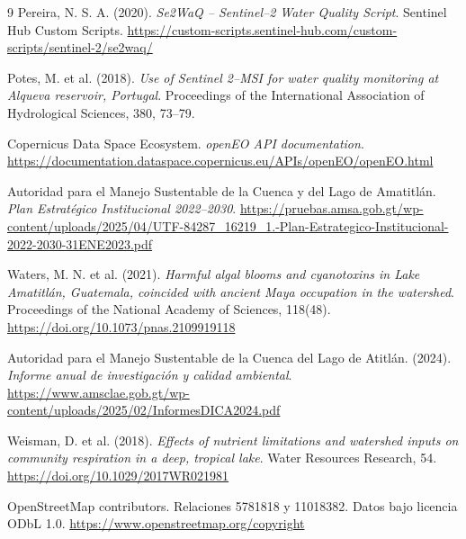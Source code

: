 \documentclass[11pt,letterpaper]{article}
\begin{document}
\begin{thebibliography}{9}
Pereira, N. S. A. (2020). \textit{Se2WaQ -- Sentinel--2 Water Quality Script}. Sentinel Hub Custom Scripts. \url{https://custom-scripts.sentinel-hub.com/custom-scripts/sentinel-2/se2waq/}

Potes, M. et al. (2018). \textit{Use of Sentinel 2--MSI for water quality monitoring at Alqueva reservoir, Portugal}. Proceedings of the International Association of Hydrological Sciences, 380, 73--79.

Copernicus Data Space Ecosystem. \textit{openEO API documentation}. \url{https://documentation.dataspace.copernicus.eu/APIs/openEO/openEO.html}

Autoridad para el Manejo Sustentable de la Cuenca y del Lago de Amatitlán. \textit{Plan Estratégico Institucional 2022--2030}. \url{https://pruebas.amsa.gob.gt/wp-content/uploads/2025/04/UTF-84287_16219_1.-Plan-Estrategico-Institucional-2022-2030-31ENE2023.pdf}

Waters, M. N. et al. (2021). \textit{Harmful algal blooms and cyanotoxins in Lake Amatitlán, Guatemala, coincided with ancient Maya occupation in the watershed}. Proceedings of the National Academy of Sciences, 118(48). \url{https://doi.org/10.1073/pnas.2109919118}

Autoridad para el Manejo Sustentable de la Cuenca del Lago de Atitlán. (2024). \textit{Informe anual de investigación y calidad ambiental}. \url{https://www.amsclae.gob.gt/wp-content/uploads/2025/02/InformesDICA2024.pdf}

Weisman, D. et al. (2018). \textit{Effects of nutrient limitations and watershed inputs on community respiration in a deep, tropical lake}. Water Resources Research, 54. \url{https://doi.org/10.1029/2017WR021981}

OpenStreetMap contributors. Relaciones 5781818 y 11018382. Datos bajo licencia ODbL 1.0. \url{https://www.openstreetmap.org/copyright}
\end{thebibliography}
\end{document}
